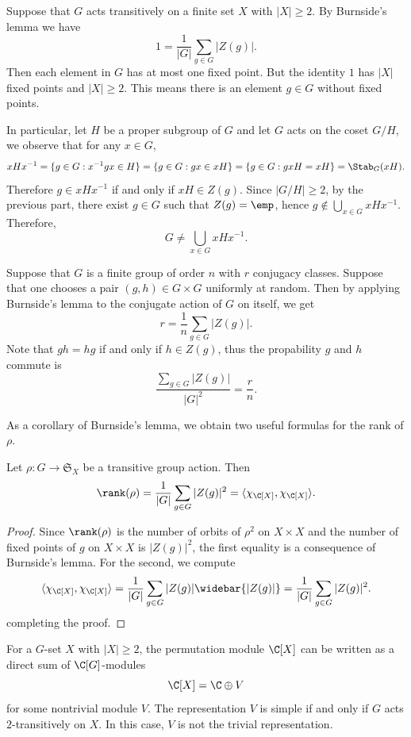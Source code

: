 \begin{example}
Suppose that $G$ acts transitively on a finite set $X$ with $|X|\geq 2$. By Burnside's lemma we have
\[1=\frac{1}{|G|}\sum_{g\in G}|Z(g)|.\]
Then each element in $G$ has at most one fixed point. But the identity $1$ has $|X|$ fixed points and $|X|\geq 2$. This means there is an element $g\in G$ without fixed points.\par
In particular, let $H$ be a proper subgroup of $G$ and let $G$ acts on the coset $G/H$, we observe that for any $x\in G$,
\begin{align*}
xHx^{-1}=\{g\in G:x^{-1}gx\in H\}=\{g\in G:gx\in xH\}=\{g\in G:gxH=xH\}=\Stab_{G}(xH).
\end{align*}
Therefore $g\in xHx^{-1}$ if and only if $xH\in Z(g)$. Since $|G/H|\geq 2$, by the previous part, there exist $g\in G$ such that $Z(g)=\emp$, hence $g\notin\bigcup_{x\in G}xHx^{-1}$. Therefore,
\[G\neq\bigcup_{x\in G}xHx^{-1}.\]
\end{example}
\begin{example}
Suppose that $G$ is a finite group of order $n$ with $r$ conjugacy classes. Suppose that one chooses a pair $(g,h)\in G\times G$ uniformly at random. Then by applying Burnside's lemma to the conjugate action of $G$ on itself, we get
\[r=\frac{1}{n}\sum_{g\in G}|Z(g)|.\]
Note that $gh=hg$ if and only if $h\in Z(g)$, thus the propability $g$ and $h$ commute is
\[\frac{\sum_{g\in G}|Z(g)|}{|G|^2}=\frac{r}{n}.\]
\end{example}
As a corollary of Burnside's lemma, we obtain two useful formulas for the rank of $\rho$.
\begin{corollary}\label{group action rank formula}
Let $\rho:G\to\mathfrak{S}_X$ be a transitive group action. Then
\[\rank(\rho)=\frac{1}{|G|}\sum_{g\in G}|Z(g)|^2=\langle\chi_{\C[X]},\chi_{\C[X]}\rangle.\]
\end{corollary}
\begin{proof}
Since $\rank(\rho)$ is the number of orbits of $\rho^2$ on $X\times X$ and the number of fixed points of $g$ on $X\times X$ is $|Z(g)|^2$, the first equality is a consequence of Burnside's lemma. For the second, we compute
\[\langle\chi_{\C[X]},\chi_{\C[X]}\rangle=\frac{1}{|G|}\sum_{g\in G}|Z(g)|\widebar{|Z(g)|}=\frac{1}{|G|}\sum_{g\in G}|Z(g)|^2.\]
completing the proof.
\end{proof}
\begin{proposition}
For a $G$-set $X$ with $|X|\geq 2$, the permutation module $\C[X]$ can be written as a direct sum of $\C[G]$-modules
\[\C[X]=\C\oplus V\]
for some nontrivial module $V$. The representation $V$ is simple if and only if $G$ acts $2$-transitively on $X$. In this case, $V$ is not the trivial representation.
\end{proposition}
